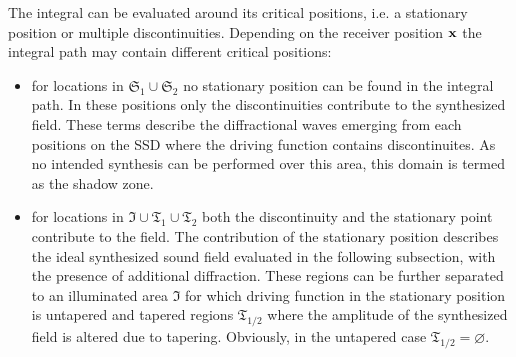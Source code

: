 \documentclass[lettersize,journal]{IEEEtran}
\let\emptyset\varnothing
\begin{document}
The integral can be evaluated around its critical positions, i.e. a stationary position or multiple discontinuities.
Depending on the receiver position $\mathbf{x}$ the integral path may contain different critical positions:
\begin{itemize}
  \item for locations in $\mathfrak{S}_1 \cup \mathfrak{S}_2$ no stationary position can be found in the integral path.
  In these positions only the discontinuities contribute to the synthesized field.
  These terms describe the diffractional waves emerging from each positions on the SSD where the driving function contains discontinuites.
  As no intended synthesis can be performed over this area, this domain is termed as the shadow zone.
  \item for locations in $\mathfrak{I} \cup \mathfrak{T}_1 \cup \mathfrak{T}_2$ both the discontinuity and the stationary point contribute to the field.
  The contribution of the stationary position describes the ideal synthesized sound field evaluated in the following subsection, with the presence of additional diffraction.
  These regions can be further separated to an illuminated area $\mathfrak{I}$ for which driving function in the stationary position is untapered and tapered regions $\mathfrak{T}_{1/2}$ where the amplitude of the synthesized field is altered due to tapering.
  Obviously, in the untapered case $\mathfrak{T}_{1/2} = \emptyset$.
\end{itemize}
\end{document}
